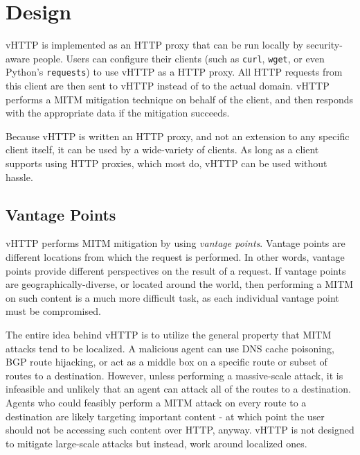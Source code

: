 \section{Design}
\label{sec:design}

vHTTP is implemented as an HTTP proxy that can be run locally by security-aware
people. Users can configure their clients (such as \texttt{curl},
\texttt{wget}, or even Python's \texttt{requests}) to use vHTTP as a HTTP
proxy. All HTTP requests from this client are then sent to vHTTP instead of
to the actual domain. vHTTP performs a MITM mitigation technique on behalf of
the client, and then responds with the appropriate data if the mitigation
succeeds.

Because vHTTP is written an HTTP proxy, and not an extension to any specific
client itself, it can be used by a wide-variety of clients. As long as a client
supports using HTTP proxies, which most do, vHTTP can be used without hassle.

\subsection{Vantage Points}

vHTTP performs MITM mitigation by using \textit{vantage points}. Vantage points
are different locations from which the request is performed. In other words,
vantage points provide different perspectives on the result of a request. If
vantage points are geographically-diverse, or located around the world, then
performing a MITM on such content is a much more difficult task, as each
individual vantage point must be compromised.

The entire idea behind vHTTP is to utilize the general property that MITM
attacks tend to be localized. A malicious agent can use DNS cache poisoning,
BGP route hijacking, or act as a middle box on a specific route or subset of
routes to a destination. However, unless performing a massive-scale attack, it
is infeasible and unlikely that an agent can attack all of the routes to a
destination. Agents who could feasibly perform a MITM attack on every route to
a destination are likely targeting important content - at which point the user
should not be accessing such content over HTTP, anyway. vHTTP is not designed
to mitigate large-scale attacks but instead, work around localized ones.

